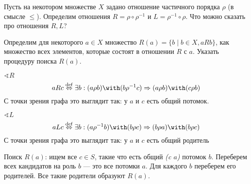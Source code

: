 \begin{exercise}
    Пусть на некотором множестве \(X\) задано отношение частичного порядка
    \(\rho\) (в смысле \( \leq \)). Определим отношения \(R = \rho \circ \rho^{ - 1}\) и \(L = \rho^{-1} \circ \rho\). Что можно сказать про отношения \(R, L\)?

    Определим для некоторого \(a \in X\) множество \(R(a) = \{b \mid b \in X, aRb\}\), как множество всех элементов, которые состоят в отношении \(R\) с \(a\). Указать процедуру поиска \(R(a)\).
\end{exercise}
\begin{solution}
    \(\sphericalangle R\)
    \[aRc \stackrel{\mathrm{def}}{\Leftrightarrow} \exists b : (a \rho b) \with (b \rho^{-1} c) \Rightarrow (a \rho b) \with (c \rho b)\]
    С точки зрения графа это выглядит так: у \(a\) и \(c\) есть общий потомок.

    \(\sphericalangle L\)
    \[aLc \stackrel{\mathrm{def}}{\Leftrightarrow} \exists b : (a \rho^{-1} b) \with (b \rho c) \Rightarrow (b \rho a) \with (b \rho c)\]
    С точки зрения графа это выглядит так: у \(a\) и \(c\) есть общий родитель

    Поиск \(R(a)\): ищем все \(c \in S\), такие что есть общий \textit{(c \(a\))} потомок \(b\). Переберем всех кандидатов на роль \(b\) --- это все потомки \(a\). Для каждого \(b\) переберем его родителей. Все такие родители образуют \(R(a)\).
\end{solution}


